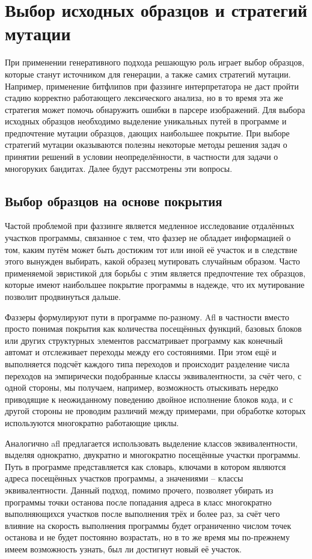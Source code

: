 \section{Выбор исходных образцов и стратегий мутации}

При применении генеративного подхода решающую роль играет выбор образцов, которые станут источником для генерации, а также самих стратегий мутации. Например, применение битфлипов при фаззинге интерпретатора не даст пройти стадию корректно работающего лексического анализа, но в то время эта же стратегия может помочь обнаружить ошибки в парсере изображений. Для выбора исходных образцов необходимо выделение уникальных путей в программе и предпочтение мутации образцов, дающих наибольшее покрытие. При выборе стратегий мутации оказываются полезны некоторые методы решения задач о принятии решений в условии неопределённости, в частности для задачи о многоруких бандитах. Далее будут рассмотрены эти вопросы.

\subsection{Выбор образцов на основе покрытия}

Частой проблемой при фаззинге является медленное исследование отдалённых участков программы, связанное с тем, что фаззер не обладает информацией о том, каким путём может быть достижим тот или иной её участок и в следствие этого вынужден выбирать, какой образец мутировать случайным образом. Часто применяемой эвристикой для борьбы с этим является предпочтение тех образцов, которые имеют наибольшее покрытие программы в надежде, что их мутирование позволит продвинуться дальше.

Фаззеры формулируют пути в программе по-разному. Afl в частности вместо просто понимая покрытия как количества посещённых функций, базовых блоков или других структурных элементов рассматривает программу как конечный автомат и отслеживает переходы между его состояниями. При этом ещё и выполняется подсчёт каждого типа переходов и происходит разделение числа переходов на эмпирически подобранные классы эквивалентности, за счёт чего, с одной стороны, мы получаем, например, возможность отыскивать нередко приводящие к неожиданному поведению двойное исполнение блоков кода, и с другой стороны не проводим различий между примерами, при обработке которых используются многократно работающие циклы.

Аналогично afl предлагается использовать выделение классов эквивалентности, выделяя однократно, двукратно и многократно посещённые участки программы. Путь в программе представляется как словарь, ключами в котором являются адреса посещённых участков программы, а значениями -- классы эквивалентности. Данный подход, помимо прочего, позволяет убирать из программы точки останова после попадания адреса в класс многократно выполняющихся участков после выполнения трёх и более раз, за счёт чего влияние на скорость выполнения программы будет ограниченно числом точек останова и не будет постоянно возрастать, но в то же время мы по-прежнему имеем возможность узнать, был ли достигнут новый её участок.

